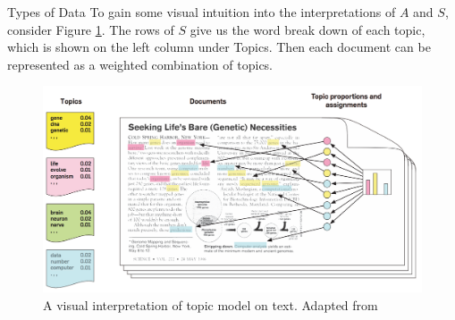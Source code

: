 \documentclass[12pt]{pom_thesis}
\begin{document}
\begin{chapter}{Types of Data}
To gain some visual intuition into the interpretations of $A$ and $S$, consider Figure \ref{fig:tmex}. The rows of $S$ give us the word break down of each topic, which is shown on the left column under Topics. Then each document can be represented as a weighted combination of topics.
\begin{figure}[h]
	\label{fig:tmex}
	\centering
	\includegraphics[width=16.2cm]{tmex}
	\caption{A visual interpretation of topic model on text. Adapted from \cite{blei2012probabilistic}}
\end{figure}

\end{chapter}
\end{document}
